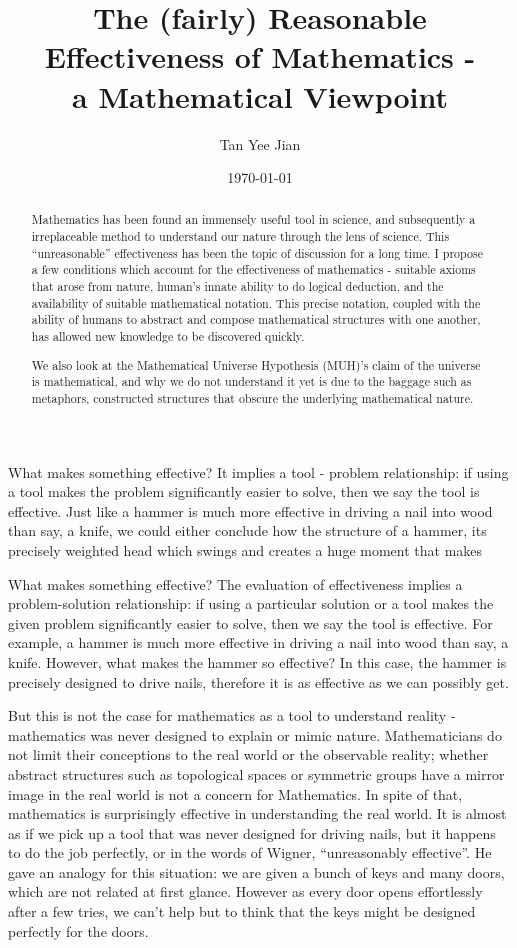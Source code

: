 \documentclass[a4paper]{article}
\title{The (fairly) Reasonable Effectiveness of Mathematics -\\ a Mathematical Viewpoint}
\author{Tan Yee Jian}
\date{\today}
\newcommand{\0}{\{\}}
\newcommand{\1}{\{\0\}}
\newcommand{\2}{\{\0,\1\}}
\newcommand{\3}{\{\0,\1,\2\}}
\newcommand{\4}{\{\0,\1,\2,\3\}}
\newcommand{\5}{\{\0,\1,\2,\3,\4\}}
\begin{document}
\maketitle
\begin{abstract}
  Mathematics has been found an immensely useful tool in science, and
  subsequently a irreplaceable method to understand our nature through the lens
  of science. This “unreasonable” effectiveness \cite{wigner} has been the topic
  of discussion for a long time. I propose a few conditions which account for
  the effectiveness of mathematics - suitable axioms that arose from nature,
  human’s innate ability to do logical deduction, and the availability of
  suitable mathematical notation. This precise notation, coupled with the
  ability of humans to abstract and compose mathematical structures with one
  another, has allowed new knowledge to be discovered quickly.

  \medskip We also look at the Mathematical Universe Hypothesis (MUH)'s claim of
  the universe is mathematical\cite{muh}, and why we do not understand it yet is
  due to the baggage such as metaphors, constructed structures that obscure the
  underlying mathematical nature.

\end{abstract}

What makes something effective? It implies a tool - problem relationship: if
using a tool makes the problem significantly easier to solve, then we say the
tool is effective. Just like a hammer is much more effective in driving a nail into
wood than say, a knife, we could either conclude how the structure of a hammer,
its precisely weighted head which swings and creates a huge moment that makes

What makes something effective? The evaluation of effectiveness implies a
problem-solution relationship: if using a particular solution or a tool makes
the given problem significantly easier to solve, then we say the tool is
effective. For example, a hammer is much more effective in driving a nail into
wood than say, a knife. However, what makes the hammer so effective? In this
case, the hammer is precisely designed to drive nails, therefore it is as
effective as we can possibly get.

But this is not the case for mathematics as a tool to understand reality -
mathematics was never designed to explain or mimic nature. Mathematicians do not
limit their conceptions to the real world or the observable reality; whether
abstract structures such as topological spaces or symmetric groups have a mirror
image in the real world is not a concern for Mathematics. In spite of that,
mathematics is surprisingly effective in understanding the real world. It is
almost as if we pick up a tool that was never designed for driving nails, but it
happens to do the job perfectly, or in the words of Wigner, “unreasonably
effective”\cite{wigner}. He gave an analogy for this situation: we are given a
bunch of keys and many doors, which are not related at first glance. However as
every door opens effortlessly after a few tries, we can’t help but to think that
the keys might be designed perfectly for the doors.
\end{document}

